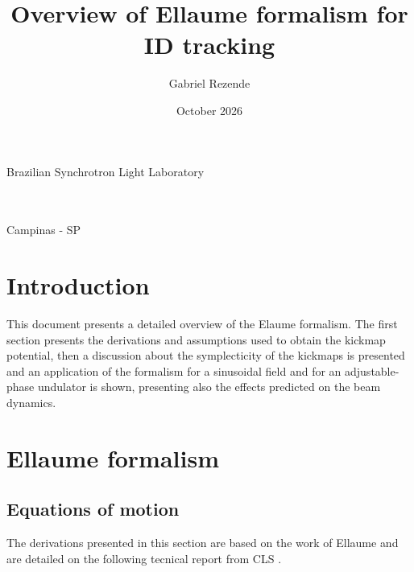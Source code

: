 \documentclass[a4paper,12pt]{article}
\title{Overview of Ellaume formalism for ID tracking}
\author{Gabriel Rezende}
\date{October 2026}
\begin{document}
\makeatletter
\begin{titlepage}
\begin{center}
    {\large Brazilian Synchrotron Light Laboratory}\\
    \vspace{7cm}
    {\Large\uppercase{\@author}\\
    \vspace{2cm}
    {\uppercase{\textbf{\@title}}}}\\
\end{center}
\vspace{2cm}
\begin{flushright}

\end{flushright}
\vspace{4cm}
\begin{center}
    {\large
    Campinas - SP\\
   \@date}
\end{center}
\end{titlepage}
\makeatother

\newpage
\tableofcontents 
\newpage
\section{Introduction} 
\par
This document presents a detailed overview of the Elaume formalism.
The first section presents the derivations and assumptions used to obtain the kickmap potential,
then a discussion about the symplecticity of the kickmaps is presented and an application of the formalism for
a sinusoidal field and for an adjustable-phase undulator is shown, presenting also the effects predicted on the beam dynamics.

\section{Ellaume formalism}
\subsection{Equations of motion}

The derivations presented in this section are based on the work of Ellaume \cite{elleaume1992approach} and are 
detailed on the following tecnical report from CLS \cite{wurtz2014kickmaps}.
\end{document}
